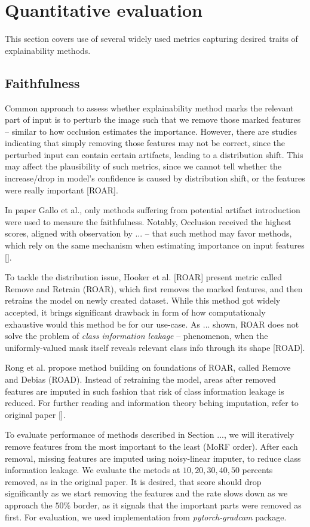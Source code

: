 \section{Quantitative evaluation}

This section covers use of several widely used metrics capturing desired traits of explainability methods.

\subsection*{Faithfulness}

Common approach to assess whether explainability method marks the relevant part of input is to perturb the image such that we remove those marked features -- similar to how occlusion estimates the importance. However, there are studies indicating that simply removing those features may not be correct, since the perturbed input can contain certain artifacts, leading to a distribution shift. This may affect the plausibility of such metrics, since we cannot tell whether the increase/drop in model's confidence is caused by distribution shift, or the features were really important [ROAR].

In paper Gallo et al., only methods suffering from potential artifact introduction were used to measure the faithfulness. Notably, Occlusion received the highest scores, aligned with observation by ... -- that such method may favor methods, which rely on the same mechanism when estimating importance on input features [].

To tackle the distribution issue, Hooker et al. [ROAR] present metric called Remove and Retrain (ROAR), which first removes the marked features, and then retrains the model on newly created dataset. While this method got widely accepted, it brings significant drawback in form of how computationaly exhaustive would this method be for our use-case. As ... shown, ROAR does not solve the problem of \emph{class information leakage} -- phenomenon, when the uniformly-valued mask itself reveals relevant class info through its shape [ROAD].

Rong et al. propose method building on foundations of ROAR, called Remove and Debias (ROAD). Instead of retraining the model, areas after removed features are imputed in such fashion that risk of class information leakage is reduced. For further reading and information theory behing imputation, refer to original paper [].

To evaluate performance of methods described in Section ..., we will iteratively remove features from the most important to the least (MoRF order). After each removal, missing features are imputed using noisy-linear imputer, to reduce class information leakage. We evaluate the metods at $10, 20, 30, 40, 50$ percents removed, as in the original paper. It is desired, that score should drop significantly as we start removing the features and the rate slows down as we approach the $50$\% border, as it signals that the important parts were removed as first. For evaluation, we used implementation from \emph{pytorch-gradcam} package.

